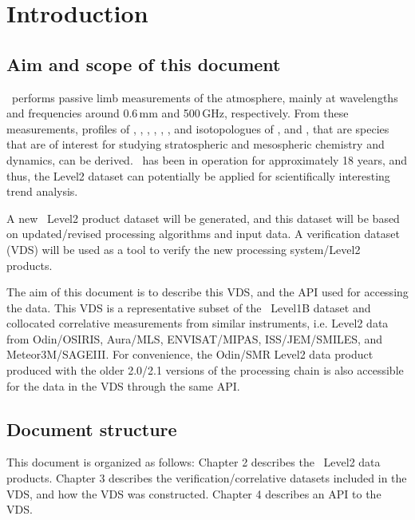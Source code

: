 \chapter{Introduction}
\label{chapter:introduction}


\setcounter{page}{1}


\section{Aim and scope of this document}
\label{sec:aim}
\smr\ performs passive limb measurements of the atmosphere,
mainly at wavelengths and frequencies around 0.6\,mm and 500\,GHz,
respectively.
From these measurements, profiles of 
, , , , 
, , and isotopologues of , and ,
that are species that are of interest for studying stratospheric and 
mesospheric chemistry and dynamics, can be derived. 
\smr\ has been in operation for approximately 18 years, and thus, the Level2
dataset can potentially be applied for scientifically interesting trend analysis.

A new \smr\ Level2 product dataset will be generated, and this dataset will be based
on updated/revised processing algorithms and input data.
A verification dataset (VDS) will be used as a tool to verify the new 
processing system/Level2 products.

The aim of this document is to describe this VDS, and the API used for
accessing the data.
This VDS is a representative subset of the \smr\ Level1B dataset
and collocated correlative measurements from similar
instruments, i.e. Level2 data from Odin/OSIRIS, Aura/MLS, ENVISAT/MIPAS,
ISS/JEM/SMILES, and Meteor3M/SAGEIII.   
For convenience, the Odin/SMR Level2 data product produced with the older
2.0/2.1 versions of the processing chain is also accessible for the data in the
VDS through the same API.

\section{Document structure}

This document is organized as follows:
Chapter 2 describes the \smr\ Level2 data products.
Chapter 3 describes the verification/correlative datasets
included in the VDS, and how the VDS was constructed.
Chapter 4 describes an API to the VDS.

